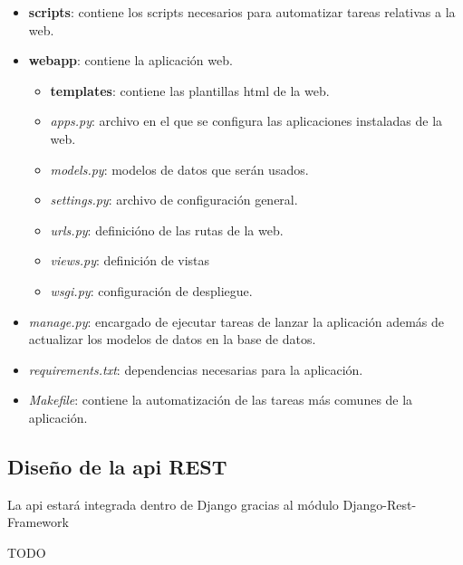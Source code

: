\begin{itemize}
  \item \textbf{scripts}: contiene los scripts necesarios para automatizar tareas relativas a la web.
  \item \textbf{webapp}: contiene la aplicación web.
  \begin{itemize}
    \item \textbf{templates}: contiene las plantillas html de la web.
    \item \textit{apps.py}: archivo en el que se configura las aplicaciones instaladas de la web.
    \item \textit{models.py}: modelos de datos que serán usados.
    \item \textit{settings.py}: archivo de configuración general.
    \item \textit{urls.py}: definicióno de las rutas de la web.
    \item \textit{views.py}: definición de vistas
    \item \textit{wsgi.py}: configuración de despliegue.
  \end{itemize}
    \item \textit{manage.py}: encargado de ejecutar tareas de lanzar la aplicación además de actualizar los modelos de datos en la base de datos.
    \item \textit{requirements.txt}: dependencias necesarias para la aplicación.
    \item \textit{Makefile}: contiene la automatización de las tareas más comunes de la aplicación.
\end{itemize}

\subsection{Diseño de la api REST}

La api estará integrada dentro de Django gracias al módulo Django-Rest-Framework

TODO
